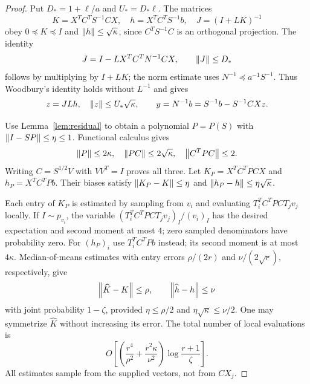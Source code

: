 \begin{proof}
Put $D_*=1+\ell/a$ and $U_*=D_*\ell$. The matrices
\[
 K=X^TC^TS^{-1}CX,\quad h=X^TC^TS^{-1}b,\quad J=(I+LK)^{-1}
\]
obey $0\preceq K\preceq I$ and $\left\lVert h\right\rVert\leq\sqrt\kappa$, since
$C^TS^{-1}C$ is an orthogonal projection. The identity
\begin{equation}\label{eq:structured-core}
 J=I-LX^TC^TN^{-1}CX,\qquad \left\lVert J\right\rVert\leq D_*
\end{equation}
follows by multiplying by $I+LK$; the norm estimate uses
$N^{-1}\preceq a^{-1}S^{-1}$. Thus Woodbury's identity holds without
$L^{-1}$ and gives
\[
 z=JLh,\quad \left\lVert z\right\rVert\leq U_*\sqrt\kappa,\qquad
 y=N^{-1}b=S^{-1}b-S^{-1}CXz.
\]

Use Lemma~\ref{lem:residual} to obtain a polynomial $P=P(S)$ with
$\left\lVert I-SP\right\rVert\leq\eta\leq1$. Functional calculus gives
\begin{equation}\label{eq:structured-polynomial-norms}
 \left\lVert P\right\rVert\leq2\kappa,\quad \left\lVert PC\right\rVert\leq2\sqrt\kappa,
 \quad \left\lVert C^TPC\right\rVert\leq2.
\end{equation}
Writing $C=S^{1/2}V$ with $VV^T=I$ proves all three.
Let $K_P=X^TC^TPCX$ and $h_P=X^TC^TPb$. Their biases satisfy
$\left\lVert K_P-K\right\rVert\leq\eta$ and
$\left\lVert h_P-h\right\rVert\leq\eta\sqrt\kappa$.

Each entry of $K_P$ is estimated by sampling from $v_i$ and evaluating
$T_i^TC^TPC T_jv_j$ locally. If $I\sim p_{v_i}$, the
variable $(T_i^TC^TPC T_jv_j)_I/(v_i)_I$ has the desired expectation and
second moment at most $4$; zero sampled denominators have probability zero.
For $(h_P)_i$ use $T_i^TC^TPb$ instead; its second moment is at most
$4\kappa$. Median-of-means estimates with entry errors
$\rho/(2r)$ and $\nu/(2\sqrt r)$, respectively, give
\[
 \left\lVert\widehat K-K\right\rVert\leq\rho,\qquad
 \left\lVert\widehat h-h\right\rVert\leq\nu
\]
with joint probability $1-\zeta$, provided
$\eta\leq\rho/2$ and $\eta\sqrt\kappa\leq\nu/2$.
One may symmetrize $\widehat K$ without increasing its error. The total
number of local evaluations is
\begin{equation}\label{eq:structured-estimates}
 O\left[\left(\frac{r^4}{\rho^2}
       +\frac{r^2\kappa}{\nu^2}\right)
       \log\frac{r+1}{\zeta}\right].
\end{equation}
All estimates sample from the supplied vectors, not from $CX_j$.


\end{proof}
